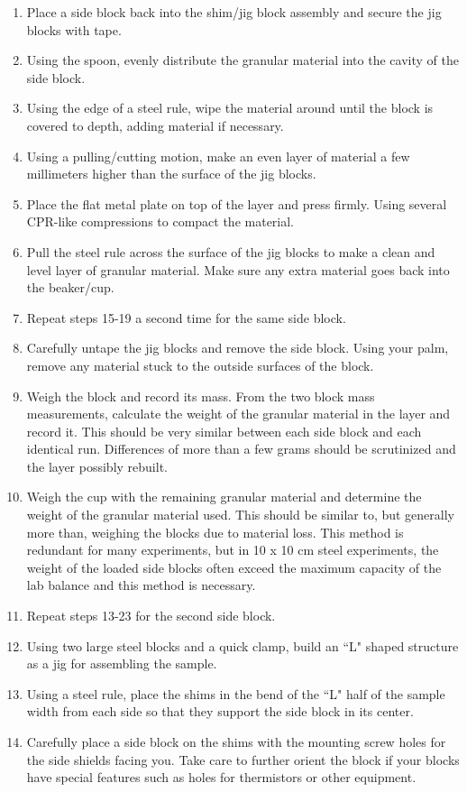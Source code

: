 \begin{enumerate}
\item Place a side block back into the shim/jig block assembly and secure the jig blocks with tape.
\item Using the spoon, evenly distribute the granular material into the cavity of the side block.
\item Using the edge of a steel rule, wipe the material around until the block is covered to depth, adding material if necessary.
\item Using a pulling/cutting motion, make an even layer of material a few millimeters higher than the surface of the jig blocks.
\item Place the flat metal plate on top of the layer and press firmly. Using several CPR-like compressions to compact the material.
\item Pull the steel rule across the surface of the jig blocks to make a clean and level layer of granular material. Make sure any extra material goes back into the beaker/cup.
\item Repeat steps 15-19 a second time for the same side block.
\item Carefully untape the jig blocks and remove the side block. Using your palm, remove any material stuck to the outside surfaces of the block.
\item Weigh the block and record its mass. From the two block mass measurements, calculate the weight of the granular material in the layer and record it. This should be very similar between each side block and each identical run. Differences of more than a few grams should be scrutinized and the layer possibly rebuilt.
\item Weigh the cup with the remaining granular material and determine the weight of the granular material used. This should be similar to, but generally more than, weighing the blocks due to material loss. This method is redundant for many experiments, but in 10 x 10 cm steel experiments, the weight of the loaded side blocks often exceed the maximum capacity of the lab balance and this method is necessary.
\item Repeat steps 13-23 for the second side block.
\item Using two large steel blocks and a quick clamp, build an ``L" shaped structure as a jig for assembling the sample.
\item Using a steel rule, place the shims in the bend of the ``L" half of the sample width from each side so that they support the side block in its center.
\item Carefully place a side block on the shims with the mounting screw holes for the side shields facing you. Take care to further orient the block if your blocks have special features such as holes for thermistors or other equipment.

\end{enumerate}
